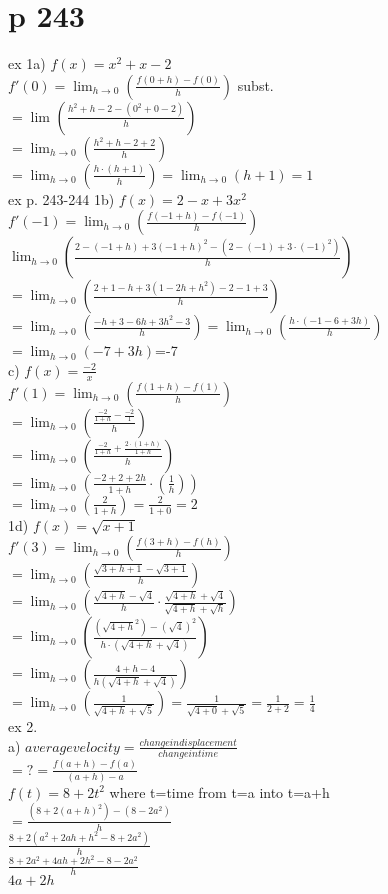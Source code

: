 \documentclass{article}
\begin{document}
  \section{p 243 }
  ex 1a) $f(x)=x^2+x-2$\\
  $f'(0)=\lim_{h\to0}(\frac{f(0+h)-f(0)}{h})$ subst.\\
  $=\lim_{}(\frac{h^2+h-2 -(0^2+0-2)}{h})$\\
  $=\lim_{h\to0}(\frac{h^2+h-2+2}{h})$\\
  $=\lim_{h\to0}(\frac{h\cdot(h+1)}{h})=\lim_{h\to0}(h+1)=1$\\
  ex p. 243-244
  1b) $f(x)=2-x+3x^2$\\
  $f'(-1)=\lim_{h\to0}(\frac{f(-1+h)-f(-1)}{h})$\\
  $\lim_{h\to0}(\frac{2-(-1+h)+3(-1+h)^2-(2-(-1)+3\cdot(-1)^2)}{h})$\\
  $=\lim_{h\to0}(\frac{2+1-h+3(1-2h+h^2)-2-1+3}{h})$\\
  $=\lim_{h\to0}(\frac{-h+3-6h+3h^2-3}{h})=\lim_{h\to0}(\frac{h\cdot(-1-6+3h)}{h})$\\
  $=\lim_{h\to0}(-7+3h)$=-7\\
  c) $f(x)=\frac{-2}{x}$\\
  $f'(1)=\lim_{h\to0}(\frac{f(1+h)-f(1)}{h})$\\
  $=\lim_{h\to0}(\frac{\frac{-2}{1+h}-\frac{-2}{1}}{h})$\\
  $=\lim_{h\to0}(\frac{\frac{-2}{1+h}+\frac{2\cdot(1+h)}{1+h}}{h})$\\
  $=\lim_{h\to0}(\frac{-2+2+2h}{1+h}\cdot(\frac{1}{h}))$\\
  $=\lim_{h\to0}(\frac{2}{1+h})=\frac{2}{1+0}=2$\\
  1d) $f(x)=\sqrt{x+1}$\\
  $f'(3)=\lim_{h\to0}(\frac{f(3+h)-f(h)}{h})$\\
  $=\lim_{h\to0}(\frac{\sqrt{3+h+1}-\sqrt{3+1}}{h})$\\
  $=\lim_{h\to0}(\frac{\sqrt{4+h}-\sqrt{4}}{h}\cdot\frac{\sqrt{4+h}+\sqrt{4}}{\sqrt{4+h}+\sqrt{h}})$\\
  $=\lim_{h\to0}(\frac{(\sqrt{4+h}^2)-(\sqrt{4})^2}{h\cdot(\sqrt{4+h}+\sqrt{4})})$\\
  $=\lim_{h\to0}(\frac{4+h-4}{h(\sqrt{4+h}+\sqrt{4})})$\\
  $=\lim_{h\to0}(\frac{1}{\sqrt{4+h}+\sqrt{5}})=\frac{1}{\sqrt{4+0}+\sqrt{5}}=\frac{1}{2+2}=\frac{1}{4}$\\
  ex 2.\\
  a) $average velocity=\frac{change in displacement}{change in time}$\\
  $=?=\frac{f(a+h)-f(a)}{(a+h)-a}$\\
  $f(t)=8+2t^2$ where t=time from t=a into t=a+h\\
  $=\frac{(8+2(a+h)^2)-(8-2a^2)}{h}$\\
  $\frac{8+2(a^2+2ah+h^2-8+2a^2)}{h}$\\
  $\frac{8+2a^2+4ah+2h^2-8-2a^2}{h}$\\
  $4a+2h$
\end{document}
